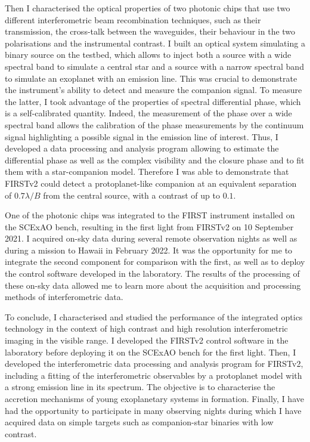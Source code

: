 Then I characterised the optical properties of two photonic chips that use two different interferometric beam recombination techniques, such as their transmission, the cross-talk between the waveguides, their behaviour in the two polarisations and the instrumental contrast. I built an optical system simulating a binary source on the testbed, which allows to inject both a source with a wide spectral band to simulate a central star and a source with a narrow spectral band to simulate an exoplanet with an emission line. This was crucial to demonstrate the instrument's ability to detect and measure the companion signal. To measure the latter, I took advantage of the properties of spectral differential phase, which is a self-calibrated quantity. Indeed, the measurement of the phase over a wide spectral band allows the calibration of the phase measurements by the continuum signal highlighting a possible signal in the emission line of interest. Thus, I developed a data processing and analysis program allowing to estimate the differential phase as well as the complex visibility and the closure phase and to fit them with a star-companion model. Therefore I was able to demonstrate that FIRSTv2 could detect a protoplanet-like companion at an equivalent separation of $0.7 \lambda / B$ from the central source, with a contrast of up to $0.1$.

One of the photonic chips was integrated to the FIRST instrument installed on the SCExAO bench, resulting in the first light from FIRSTv2 on 10 September 2021. I acquired on-sky data during several remote observation nights as well as during a mission to Hawaii in February 2022. It was the opportunity for me to integrate the second component for comparison with the first, as well as to deploy the control software developed in the laboratory. The results of the processing of these on-sky data allowed me to learn more about the acquisition and processing methods of interferometric data.

To conclude, I characterised and studied the performance of the integrated optics technology in the context of high contrast and high resolution interferometric imaging in the visible range. I developed the FIRSTv2 control software in the laboratory before deploying it on the SCExAO bench for the first light. Then, I developed the interferometric data processing and analysis program for FIRSTv2, including a fitting of the interferometric observables by a protoplanet model with a strong emission line in its spectrum. The objective is to characterise the accretion mechanisms of young exoplanetary systems in formation. Finally, I have had the opportunity to participate in many observing nights during which I have acquired data on simple targets such as companion-star binaries with low contrast.

